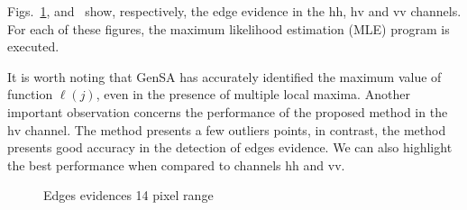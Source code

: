 \documentclass[conference]{IEEEtran}
\begin{document}
Figs.~\ref{evidencias_hh_hv_vv},  and~ show, respectively, the edge evidence in the $\text{hh}$, $\text{hv}$ and $\text{vv}$ channels. For each of these figures, the maximum likelihood estimation (MLE) program is executed.

It is worth noting that GenSA has accurately identified the maximum value of function $\ell(j)$, even in the presence of multiple local maxima. Another important observation concerns the performance of the proposed method in the $\text{hv}$ channel. The method presents a few outliers points, in contrast, the method presents good accuracy in the detection of edges evidence. We can also highlight the best performance when compared to channels $\text{hh}$ and $\text{vv}$. 


   \begin{figure}[hbt]
	\centering
     \caption{Edges evidences 14 pixel range}
     \label{evidencias_hh_hv_vv} 
   \end{figure}
\end{document}
